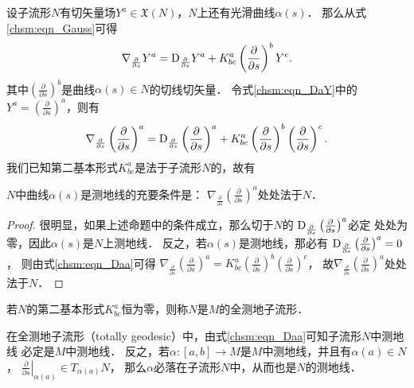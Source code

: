 设子流形$N$有切矢量场$Y^a \in \mathfrak{X}(N)$，$N$上还有光滑曲线$\alpha(s)$．
那么从式\eqref{chsm:eqn_Gauss}可得
\begin{equation}\label{chsm:eqn_DaY}
    \nabla_{\frac{\partial}{\partial s}} Y^a = {\rm D}_{\frac{\partial}{\partial s}} Y^a
     + K^a_{bc} \left(\frac{\partial}{\partial s}\right)^b Y^c .
\end{equation}
其中$\left(\frac{\partial}{\partial s}\right)^b$是曲线$\alpha(s)\in N$的切线切矢量．
令式\eqref{chsm:eqn_DaY}中的$Y^a=\left(\frac{\partial}{\partial s}\right)^a$，则有
\begin{equation}\label{chsm:eqn_Daa}
    \nabla_{\frac{\partial}{\partial s}} \left(\frac{\partial}{\partial s}\right)^a
     = {\rm D}_{\frac{\partial}{\partial s}} \left(\frac{\partial}{\partial s}\right)^a
    + K^a_{bc} \left(\frac{\partial}{\partial s}\right)^b \left(\frac{\partial}{\partial s}\right)^c .
\end{equation}
我们已知第二基本形式$K^a_{bc}$是法于子流形$N$的，故有
\begin{proposition}\label{chsm:thm_sub-Geodesic}
    $N$中曲线$\alpha(s)$是测地线的充要条件是：
    $\nabla_{\frac{\partial}{\partial s}} \left(\frac{\partial}{\partial s}\right)^a$处处法于$N$．
\end{proposition}
\begin{proof}
很明显，如果上述命题中的条件成立，那么切于$N$的
${\rm D}_{\frac{\partial}{\partial s}} \left(\frac{\partial}{\partial s}\right)^a$必定
处处为零，因此$\alpha(s)$是$N$上测地线．
反之，若$\alpha(s)$是测地线，那必有
${\rm D}_{\frac{\partial}{\partial s}} \left(\frac{\partial}{\partial s}\right)^a=0$，
则由式\eqref{chsm:eqn_Daa}可得 $\nabla_{\frac{\partial}{\partial s}} \left(\frac{\partial}{\partial s}\right)^a
= K^a_{bc} \left(\frac{\partial}{\partial s}\right)^b \left(\frac{\partial}{\partial s}\right)^c $，
故$\nabla_{\frac{\partial}{\partial s}} \left(\frac{\partial}{\partial s}\right)^a$处处法于$N$．
\end{proof}



\begin{definition}\label{chsm:def_total-geodesic}
    若$N$的第二基本形式$K^a_{bc}$恒为零，则称$N$是$M$的{\heiti 全测地子流形}．
\end{definition}

在全测地子流形（totally geodesic）中，由式\eqref{chsm:eqn_Daa}可知子流形$N$中测地线
必定是$M$中测地线．
反之，若$\alpha:[a,b]\to M$是$M$中测地线，并且有$\alpha(a)\in N$，
$\left. \frac{\partial}{\partial s}\right|_{\alpha(a)} \in T_{\alpha(a)}N$，
那么$\alpha$必落在子流形$N$中，从而也是$N$的测地线．




